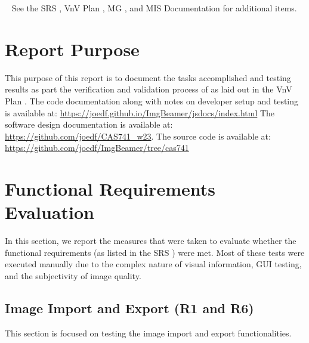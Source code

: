 \documentclass[12pt, titlepage]{article}
\begin{document}
~\newline
\noindent See the SRS \cite{SRS}, VnV Plan \cite{VnV_plan}, MG \cite{MG},
and MIS \cite{MIS} Documentation for additional items.

\newpage

\tableofcontents

\listoftables %

\listoffigures %

\newpage


\section{Report Purpose}
This purpose of this report is to document the tasks accomplished and
testing results as part the verification and validation process of \progname{}
as laid out in the VnV Plan \cite{VnV_plan}. The code documentation along with notes
on developer setup and testing is available at:
\url{https://joedf.github.io/ImgBeamer/jsdocs/index.html} The software design documentation
is available at: \url{https://github.com/joedf/CAS741_w23}. The source code is
available at: \url{https://github.com/joedf/ImgBeamer/tree/cas741}

\section{Functional Requirements Evaluation}
In this section, we report the measures that were taken to evaluate whether the
functional requirements (as listed in the SRS \cite{SRS}) were met.
Most of these tests were executed manually due to the complex nature of visual information, GUI testing, and
the subjectivity of image quality.

\subsection{Image Import and Export (R1 and R6)}
This section is focused on testing the image import and export functionalities.
\end{document}
